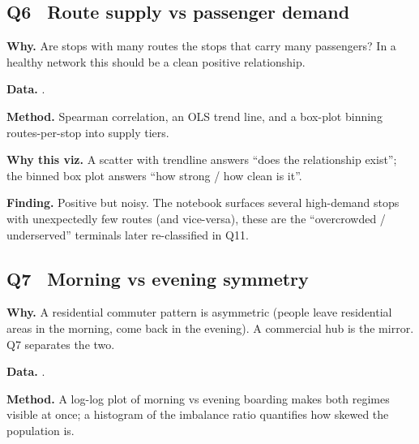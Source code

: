 \subsection{Q6 \textbullet\ Route supply vs passenger demand}

\textbf{Why.} Are stops with many routes the stops that carry many
passengers? In a healthy network this should be a clean positive
relationship.

\textbf{Data.} .

\textbf{Method.} Spearman correlation, an OLS trend line, and a
box-plot binning routes-per-stop into supply tiers.


\textbf{Why this viz.} A scatter with trendline answers ``does the
relationship exist''; the binned box plot answers ``how strong / how
clean is it''.

\textbf{Finding.} Positive but noisy. The notebook surfaces several
high-demand stops with unexpectedly few routes (and vice-versa), 
these are the ``overcrowded / underserved'' terminals later
re-classified in Q11.

\subsection{Q7 \textbullet\ Morning vs evening symmetry}

\textbf{Why.} A residential commuter pattern is asymmetric (people
leave residential areas in the morning, come back in the evening). A
commercial hub is the mirror. Q7 separates the two.

\textbf{Data.} .

\textbf{Method.} A log-log plot of morning vs evening boarding makes
both regimes visible at once; a histogram of the imbalance ratio
quantifies how skewed the population is.


